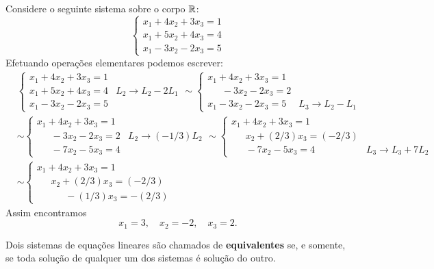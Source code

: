 \begin{exemplo}
	Considere o seguinte sistema sobre o corpo $\mathbb{R}$:
	\[
	\begin{cases}
		x_1 + 4x_2 + 3x_3 = 1\\
		x_1 + 5x_2 + 4x_3 = 4\\
		x_1 - 3x_2 - 2x_3 = 5
	\end{cases}
	\]
	Efetuando opera\c{c}\~oes elementares podemos escrever:
	\begin{align*}
	&\begin{cases}
		x_1 + 4x_2 + 3x_3 = 1\\
		x_1 + 5x_2 + 4x_3 = 4 & L_2 \rightarrow L_2 - 2L_1\\
		x_1 - 3x_2 - 2x_3 = 5
	\end{cases} \sim
	\begin{cases}
		x_1 + 4x_2 + 3x_3 = 1\\
		\phantom{0x_1} -3x_2 - 2x_3 = 2\\
		x_1 - 3x_2 - 2x_3 = 5 & L_3 \rightarrow L_2 - L_1
	\end{cases}\\ & \sim
	\begin{cases}
		x_1 + 4x_2 + 3x_3 = 1\\
		\phantom{0x_1} - 3x_2 - 2x_3 = 2 & L_2 \rightarrow (-1/3)L_2\\
		\phantom{0x_1} - 7x_2 - 5x_3 = 4
	\end{cases} \sim
	\begin{cases}
		x_1 + 4x_2 + 3x_3 = 1\\
		\phantom{0x_1} x_2 + (2/3)x_3 = (-2/3)\\
		\phantom{0x_1} - 7x_2 - 5x_3 = 4 & L_3 \rightarrow L_3 + 7L_2
	\end{cases}\\ & \sim
	\begin{cases}
		x_1 + 4x_2 + 3x_3 = 1\\
		\phantom{0x_1} x_2 + (2/3)x_3 = (-2/3)\\
		\phantom{0x_1} \phantom{0x_2}  -(1/3)x_3 = -(2/3)
	\end{cases}
	\end{align*}
	Assim encontramos
	\[
		x_1 = 3, \quad x_2 = -2, \quad x_3 = 2.
	\]
\end{exemplo}

\begin{definicao}
	Dois sistemas de equa\c{c}\~oes lineares s\~ao chamados de \textbf{equivalentes} se, e somente, se toda solu\c{c}\~ao de qualquer um dos sistemas \'e solu\c{c}\~ao do outro.
\end{definicao}

